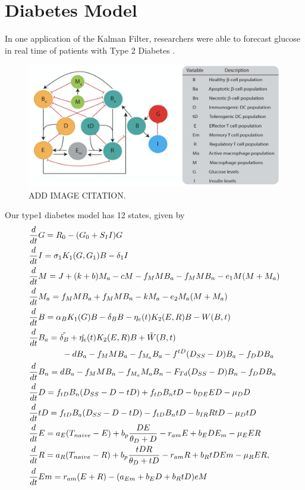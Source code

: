 \section{Diabetes Model}
\label{Diabetes Model}



In one application of the Kalman Filter, researchers were able to forecast glucose in real time of patients with Type 2 Diabetes \cite{article1}.

\begin{figure}[h]
    \centering
    \includegraphics[scale = 0.5]{t1d_model.png}
    \caption{ADD IMAGE CITATION.}
\end{figure}

Our type1 diabetes model has 12 states, given by 
\begin{align*}
    &\frac{d}{dt} G = R_0 - (G_0 + S_I I)G \\ 
    &\frac{d}{dt}  I = \sigma_1 K_1 (G, G_1) B - \delta_1 I \\
    &\frac{d}{dt} M = J +(k+b)M_a -cM - f_M MB_a - f_M MB_n - e_1M(M+M_a) \\
    & \frac{d}{dt} M_a = f_M MB_a +f_M MB_n - kM_a - e_2M_a(M + M_a) \\
    &\frac{d}{dt} B = \alpha_B K_1(G)B - \delta_B B - \eta_e(t)K_2(E,R)B - W(B, t)\\
    & \frac{d}{dt} B_a = \Tilde{\delta_B} + \Tilde{\eta_e} (t)K_2(E,R)B + \Tilde{W}(B, t) \\
    & \quad \quad  \quad \quad - dB_a - f_M MB_a - f_{M_a} B_a - f^{tD}(D_{SS} - D)B_a - f_D DB_a \\
    &\frac{d}{dt} B_n = dB_a - f_M MB_n - f_{M_a} M_a B_n - F_{Td}(D_{SS} - D)B_n - f_D DB_n \\
    & \frac{d}{dt} D = f_{tD}B_n(D_{SS} - D - tD) + f_{tD}B_n tD - b_{DE} ED - \mu_D D \\
    & \frac{d}{dt} tD = f_{tD}B_a(D_{SS} - D - tD) - f_{tD}B_n tD - b_{IR}RtD - \mu_D tD \\
    & \frac{d}{dt} E = a_E (T_{naive} - E) + b_p \frac{DE}{\theta_D + D} - r_{am}E + b_EDE_m - \mu_E ER \\
    & \frac{d}{dt} R = a_R (T_{naive} - R) + b_p \frac{tDR}{\theta_D + tD} - r_{am}R + b_R tDEm - \mu_R ER, \\
    & \frac{d}{dt} Em = r_{am}(E + R) - (a_{Em} + b_E D + b_R tD)eM
\end{align*}